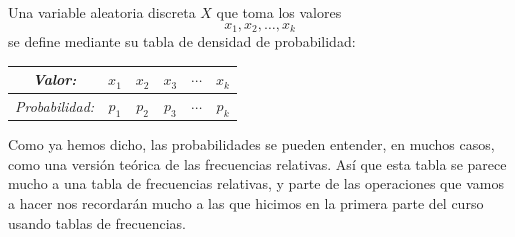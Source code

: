 \documentclass[10pt,a4paper]{article}\usepackage[]{graphicx}\usepackage[]{color}
\begin{document}
Una variable aleatoria discreta $X$ que toma los valores
\[x_1, x_2, \ldots, x_k\]
se define mediante su tabla de densidad de probabilidad:
    \begin{center}
    \begin{tabular}[t]{|c|c|c|c|c|c|}
    \hline
    \rule{0cm}{0.5cm}{\em Valor:}&$x_1$&$x_2$&$x_3$&$\cdots$&$x_k$\\
    \hline
    \rule{0cm}{0.7cm}{\em Probabilidad:}&$p_1$&$p_2$&$p_3$&$\cdots$&$p_k$\\
    \hline
    \end{tabular}
    \end{center}
Como ya hemos dicho, las probabilidades se pueden entender, en muchos casos, como una versión teórica de las frecuencias relativas. Así que esta tabla se parece mucho a una tabla de frecuencias relativas, y parte de las operaciones que vamos a hacer nos recordarán mucho a las que hicimos en la primera parte del curso usando tablas de frecuencias.
\end{document}
